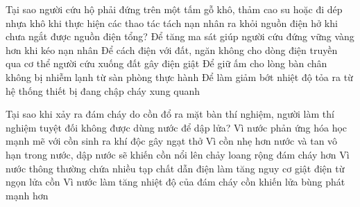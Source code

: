 



\begin{ex}
Tại sao người cứu hộ phải đứng trên một tấm gỗ khô, thảm cao su hoặc đi dép nhựa khô khi thực hiện các thao tác tách nạn nhân ra khỏi nguồn điện hở khi chưa ngắt được nguồn điện tổng?
\choice
{Để tăng ma sát giúp người cứu đứng vững vàng hơn khi kéo nạn nhân}
{\True Để cách điện với đất, ngăn không cho dòng điện truyền qua cơ thể người cứu xuống đất gây điện giật}
{Để giữ ấm cho lòng bàn chân không bị nhiễm lạnh từ sàn phòng thực hành}
{Để làm giảm bớt nhiệt độ tỏa ra từ hệ thống thiết bị đang chập cháy xung quanh}
\end{ex}

\begin{ex}
Tại sao khi xảy ra đám cháy do cồn đổ ra mặt bàn thí nghiệm, người làm thí nghiệm tuyệt đối không được dùng nước để dập lửa?
\choice
{Vì nước phản ứng hóa học mạnh mẽ với cồn sinh ra khí độc gây ngạt thở}
{\True Vì cồn nhẹ hơn nước và tan vô hạn trong nước, dập nước sẽ khiến cồn nổi lên chảy loang rộng đám cháy hơn}
{Vì nước thông thường chứa nhiều tạp chất dẫn điện làm tăng nguy cơ giật điện từ ngọn lửa cồn}
{Vì nước làm tăng nhiệt độ của đám cháy cồn khiến lửa bùng phát mạnh hơn}
\end{ex}

